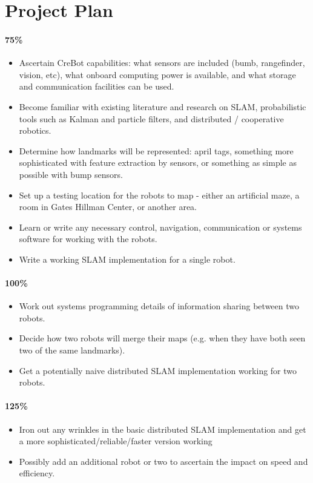 \documentclass[11pt]{article}
\begin{document}
\section*{Project Plan}

\paragraph{75\%}
\begin{itemize}
    \item Ascertain CreBot capabilities: what sensors are included (bumb, rangefinder, vision, etc), what onboard computing power is available, and what storage and communication facilities can be used.
    \item Become familiar with existing literature and research on SLAM, probabilistic tools such as Kalman and particle filters, and distributed / cooperative robotics.
    \item Determine how landmarks will be represented: april tags, something more sophisticated with feature extraction by sensors, or something as simple as possible with bump sensors.
    \item Set up a testing location for the robots to map - either an artificial maze, a room in Gates Hillman Center, or another area.
    \item Learn or write any necessary control, navigation, communication or systems software for working with the robots.
    \item Write a working SLAM implementation for a single robot.
\end{itemize}

\paragraph{100\%}

\begin{itemize}
    \item Work out systems programming details of information sharing between two robots.
    \item Decide how two robots will merge their maps (e.g. when they have both seen two of the same landmarks).
    \item Get a potentially naive distributed SLAM implementation working for two robots.
\end{itemize}

\paragraph{125\%}
\begin{itemize}
    \item Iron out any wrinkles in the basic distributed SLAM implementation and get a more sophisticated/reliable/faster version working
    \item Possibly add an additional robot or two to ascertain the impact on speed and efficiency.
\end{itemize}
\end{document}
